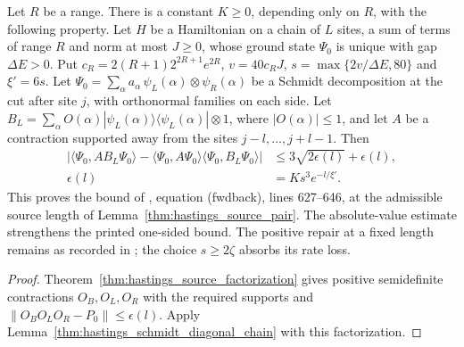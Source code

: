 \begin{lemma}
    \label{thm:hastings_fwdback}
    \leanok
    Let $R$ be a range. There is a constant $K\ge0$, depending only on $R$,
    with the following property. Let $H$ be a Hamiltonian on a chain of $L$
    sites, a sum of terms of range $R$ and norm at most $J\ge0$, whose ground
    state $\Psi_0$ is unique with gap $\Delta E>0$. Put
    $c_R=2(R+1)2^{2R+1}e^{2R}$, $v=40c_RJ$,
    $s=\max\{2v/\Delta E,80\}$ and $\xi'=6s$.
    Let $\Psi_0=\sum_\alpha a_\alpha\,\psi_L(\alpha)\otimes\psi_R(\alpha)$
    be a Schmidt decomposition at the cut after site $j$, with orthonormal
    families on each side. Let
    $B_L=\sum_\alpha O(\alpha)|\psi_L(\alpha)\rangle\langle\psi_L(\alpha)|
        \otimes1$, where $|O(\alpha)|\le1$, and let $A$ be a contraction
    supported away from the sites $j-l,\dots,j+l-1$. Then
    \begin{align}
        \bigl|\langle\Psi_0,AB_L\Psi_0\rangle
        -\langle\Psi_0,A\Psi_0\rangle\langle\Psi_0,B_L\Psi_0\rangle\bigr|
                    & \le3\sqrt{2\epsilon(l)}+\epsilon(l),
        \label{eq:hastings_source_correlation}             \\
        \epsilon(l) & =K s^3e^{-l/\xi'}.
        \label{eq:hastings_source_correlation_error}
    \end{align}
    This proves the bound of \cite[Lemma~3]{Hastings2007AreaLaw},
    equation (fwdback), lines 627--646, at the admissible source length of
    Lemma~\ref{thm:hastings_source_pair}. The absolute-value estimate
    strengthens the printed one-sided bound. The positive repair at a fixed
    length remains as recorded in
    \cite{gap:hastings07_lemma1_positivity_rate}; the choice $s\ge2\zeta$
    absorbs its rate loss.
\end{lemma}
\begin{proof}\leanok
    Theorem~\ref{thm:hastings_source_factorization} gives positive
    semidefinite contractions $O_B,O_L,O_R$ with the required supports and
    $\|O_BO_LO_R-P_0\|\le\epsilon(l)$. Apply
    Lemma~\ref{thm:hastings_schmidt_diagonal_chain} with this factorization.
\end{proof}
